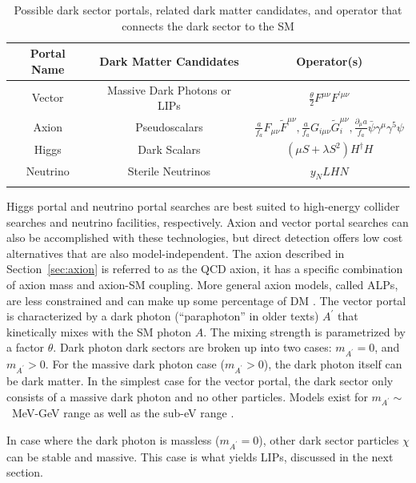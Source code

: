 \begin{table}[htp]
\caption{Possible dark sector portals, related dark matter candidates, and operator that connects the dark sector to the \ac{SM}}
\begin{center}
\begin{tabular}{ c c c }
Portal Name & Dark Matter Candidates &  Operator(s) \\
\hline
Vector & Massive Dark Photons or LIPs & $\frac{\theta}{2} F^{\mu \nu} F^{\prime \mu\nu}$ \\
Axion & Pseudoscalars & $\frac{a}{f_{a}} F_{\mu \nu} \tilde{F}^{\mu \nu}, \frac{a}{f_{a}} G_{i\mu \nu} \tilde{G}_{i}^{\mu \nu},  \frac{\partial_{\mu}a}{f_{a}} \bar{\psi}\gamma^{\mu}\gamma^{5} \psi $ \\
Higgs & Dark Scalars & $(\mu S +\lambda S^{2})H^{\dagger}H $ \\
Neutrino & Sterile Neutrinos & $y_{N}LHN$ \\
\label{tb:portals}
\end{tabular}
\end{center}
\label{default}
\end{table}%

Higgs portal and neutrino portal searches are best suited to high-energy collider searches and neutrino facilities, respectively. Axion and vector portal searches can also be accomplished with these technologies, but direct detection offers low cost alternatives that are also model-independent. The axion described in Section~\ref{sec:axion} is referred to as the QCD axion, it has a specific combination of axion mass and axion-\ac{SM} coupling. More general axion models, called \ac{ALP}s, are less constrained and can make up some percentage of \ac{DM} \cite{Essig2013}. The vector portal is characterized by a dark photon (``paraphoton'' in older texts) $A^{\prime}$ that kinetically mixes with the \ac{SM} photon $A$. The mixing strength is parametrized by a factor $\theta$. Dark photon dark sectors are broken up into two cases: $m_{A^{\prime}} = 0$, and $m_{A^{\prime}} > 0$. For the massive dark photon case ($m_{A^{\prime}} > 0$), the dark photon itself can be dark matter. In the simplest case for the vector portal, the dark sector only consists of a massive dark photon and no other particles. Models exist for $m_{A^{\prime}} \sim$~MeV-GeV range as well as the sub-eV range \cite{Essig2013}.

In case where the dark photon is massless ($m_{A^{\prime}} = 0$), other dark sector particles $\chi$ can be stable and massive. This case is what yields \ac{LIP}s, discussed in the next section.


